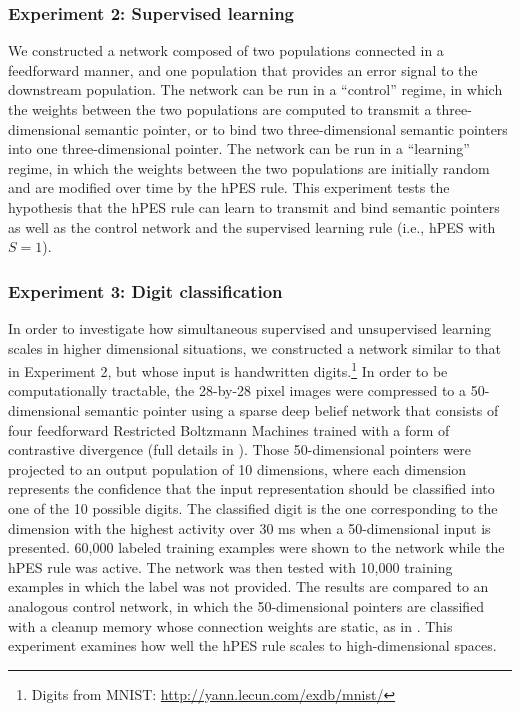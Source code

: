 \documentclass[10pt,letterpaper]{article}
\begin{document}
\subsubsection{Experiment 2: Supervised learning}

We constructed a network composed of two populations
connected in a feedforward manner,
and one population that provides
an error signal to the downstream population.
The network can be run in a ``control'' regime,
in which the weights between the two populations
are computed to transmit a three-dimensional semantic pointer,
or to bind two three-dimensional semantic pointers
into one three-dimensional pointer.
The network can be run in a ``learning'' regime,
in which the weights between the two populations
are initially random
and are modified over time by the hPES rule.
This experiment tests the hypothesis that the hPES
rule can learn to transmit and bind semantic pointers
as well as the control network and the supervised
learning rule (i.e., hPES with $S=1$).

\subsubsection{Experiment 3: Digit classification}

In order to investigate how
simultaneous supervised and unsupervised learning
scales in higher dimensional situations,
we constructed a network similar to that in Experiment 2,
but whose input is handwritten digits.\footnote{Digits
  from MNIST: \url{http://yann.lecun.com/exdb/mnist/}}
In order to be computationally tractable,
the 28-by-28 pixel images were compressed to a 50-dimensional
semantic pointer using a sparse deep belief network
that consists of four feedforward
Restricted Boltzmann Machines
trained with a form of contrastive divergence
(full details in ).
Those 50-dimensional pointers were projected to
an output population of 10 dimensions,
where each dimension represents
the confidence that the input representation should
be classified into one of the 10 possible digits.
The classified digit is the one corresponding
to the dimension with the highest activity
over 30 ms when a 50-dimensional input is presented.
60,000 labeled training examples
were shown to the network while
the hPES rule was active.
The network was then tested with 10,000
training examples in which the label
was not provided.
The results are compared to an analogous control network,
in which the 50-dimensional pointers are classified
with a cleanup memory whose connection weights
are static, as in .
This experiment examines how well the hPES rule scales
to high-dimensional spaces.
\end{document}
